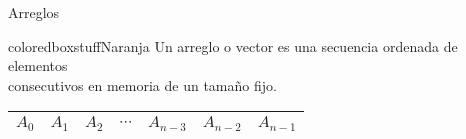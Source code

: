 \documentclass[aspectratio=169]{beamer}
\begin{document}

\begin{frame}[fragile]{Arreglos}
    \begin{beamercolorbox}[wd=1\textwidth,sep=1em]{coloredboxstuffNaranja}
    \centering \large
    Un arreglo o vector es una secuencia ordenada de elementos\\ consecutivos en memoria de un tamaño fijo.
    \end{beamercolorbox}
    \bigskip
    \begin{center}
    \large
    \begin{tabular}{|C{0.8cm}|C{0.8cm}|C{0.8cm}|C{1.8cm}|C{0.8cm}|C{0.8cm}|C{0.8cm}|}
     \hline
     $A_0$ & $A_1$ & $A_2$ & $\cdots$ & $A_{n-3}$ & $A_{n-2}$ & $A_{n-1}$ \\
     \hline
    \end{tabular}
    \end{center}
\end{frame}
\end{document}

